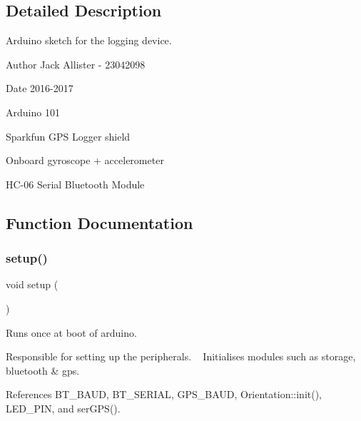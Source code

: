 \subsection{Detailed Description}
Arduino sketch for the logging device. 

\begin{DoxyAuthor}{Author}
Jack Allister -\/ 23042098 
\end{DoxyAuthor}
\begin{DoxyDate}{Date}
2016-\/2017
\begin{DoxyItemize}
\item Arduino 101
\item Sparkfun G\+PS Logger shield
\item Onboard gyroscope + accelerometer
\item H\+C-\/06 Serial Bluetooth Module 
\end{DoxyItemize}
\end{DoxyDate}


\subsection{Function Documentation}
\mbox{\label{logging-device_8ino_a4fc01d736fe50cf5b977f755b675f11d}} 
\subsubsection{\texorpdfstring{setup()}{setup()}}
{\footnotesize\ttfamily void setup (\begin{DoxyParamCaption}{ }\end{DoxyParamCaption})}



Runs once at boot of arduino. 

Responsible for setting up the peripherals. ~\newline
Initialises modules such as storage, bluetooth \& gps. 

References B\+T\+\_\+\+B\+A\+UD, B\+T\+\_\+\+S\+E\+R\+I\+AL, G\+P\+S\+\_\+\+B\+A\+UD, Orientation\+::init(), L\+E\+D\+\_\+\+P\+IN, and ser\+G\+P\+S().


